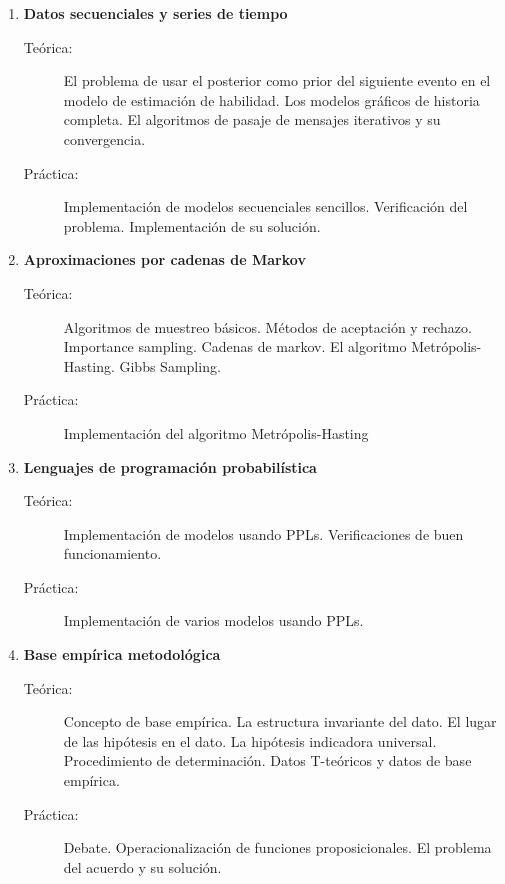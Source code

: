 \documentclass[10pt]{article}
\begin{document}
\begin{enumerate}

\vspace{0.1cm}
\item \textbf{Datos secuenciales y series de tiempo}
\vspace{-0.15cm}
\begin{description}
\item[Teórica:] El problema de usar el posterior como prior del siguiente evento en el modelo de estimación de habilidad. Los modelos gráficos de historia completa. El algoritmos de pasaje de mensajes iterativos y su convergencia.
\item[Práctica:] Implementación de modelos secuenciales sencillos. Verificación del problema. Implementación de su solución.
\end{description}


\vspace{0.1cm}
\item \textbf{Aproximaciones por cadenas de Markov}
\vspace{-0.15cm}
\begin{description}
\item[Teórica:] Algoritmos de muestreo básicos. Métodos de aceptación y rechazo. Importance sampling. Cadenas de markov. El algoritmo Metrópolis-Hasting. Gibbs Sampling.
\item[Práctica:] Implementación del algoritmo Metrópolis-Hasting
\end{description}


\vspace{0.1cm}
\item \textbf{Lenguajes de programación probabilística}
\vspace{-0.15cm}
\begin{description}
\item[Teórica:] Implementación de modelos usando PPLs. Verificaciones de buen funcionamiento. 
\item[Práctica:] Implementación de varios modelos usando PPLs.
\end{description}


\vspace{0.1cm}
\item \textbf{Base empírica metodológica}
\vspace{-0.15cm}
\begin{description}
\item[Teórica:] Concepto de base empírica. La estructura invariante del dato. El lugar de las hipótesis en el dato. La hipótesis indicadora universal. Procedimiento de determinación. Datos T-teóricos y datos de base empírica.
\item[Práctica:] Debate. Operacionalización de funciones proposicionales. El problema del acuerdo y su solución.


\end{description}

\end{enumerate}

\nocite{jaynes1984-bayesianBackground, mcelreath2020-rethinking, bishop2006-PRML, pearl2009-causality, cinelli2021-crashCourse, stan-userGuide, martin2021-BMCP, samaja1999-epistemologiaMetodologia }

{

}
\end{document}
